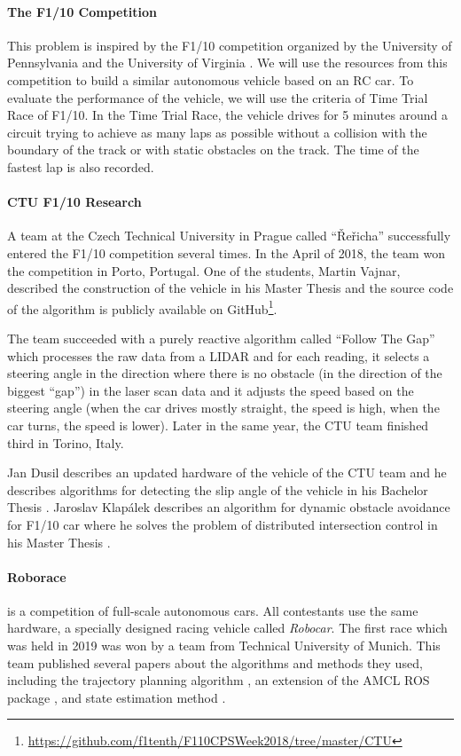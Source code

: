 \paragraph{The F1/10 Competition}

This problem is inspired by the F1/10 competition organized by the University of Pennsylvania and the University of Virginia \cite{F1/10_web}. We will use the resources from this competition to build a similar autonomous vehicle based on an RC car. To evaluate the performance of the vehicle, we will use the criteria of Time Trial Race of F1/10. In the Time Trial Race, the vehicle drives for 5 minutes around a circuit trying to achieve as many laps as possible without a collision with the boundary of the track or with static obstacles on the track. The time of the fastest lap is also recorded.

\paragraph{CTU F1/10 Research} A team at the Czech Technical University in Prague called ``Řeřicha'' successfully entered the F1/10 competition several times. In the April of 2018, the team won the competition in Porto, Portugal. One of the students, Martin Vajnar, described the construction of the vehicle in his Master Thesis \cite{ctu_martin_vajnar} and the source code of the algorithm is publicly available on GitHub\footnote{\url{https://github.com/f1tenth/F110CPSWeek2018/tree/master/CTU}}.

The team succeeded with a purely reactive algorithm called ``Follow The Gap'' which processes the raw data from a LIDAR and for each reading, it selects a steering angle in the direction where there is no obstacle (in the direction of the biggest ``gap'') in the laser scan data and it adjusts the speed based on the steering angle (when the car drives mostly straight, the speed is high, when the car turns, the speed is lower). Later in the same year, the CTU team finished third in Torino, Italy.

Jan Dusil describes an updated hardware of the vehicle of the CTU team and he describes algorithms for detecting the slip angle of the vehicle in his Bachelor Thesis \cite{ctu_jan_dusil}. Jaroslav Klapálek describes an algorithm for dynamic obstacle avoidance for F1/10 car where he solves the problem of distributed intersection control in his Master Thesis \cite{ctu_jaroslav_klapalek}.

\paragraph{Roborace} is a competition of full-scale autonomous cars. All contestants use the same hardware, a specially designed racing vehicle called \textit{Robocar}. The first race which was held in 2019 was won by a team from Technical University of Munich. This team published several papers about the algorithms and methods they used, including the trajectory planning algorithm \cite{tum_roborace_planning}, an extension of the AMCL ROS package \cite{tum_roborace_ros}, and state estimation method \cite{tum_roborace_state_estimation}.